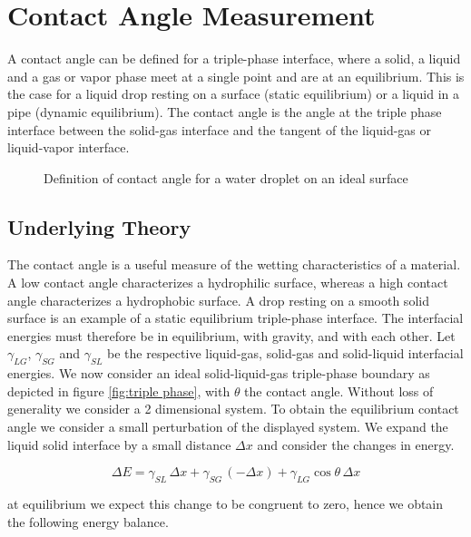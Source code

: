 \section{Contact Angle Measurement}

A contact angle can be defined for a triple-phase interface, where a solid, a liquid and a gas or vapor phase meet at a single point and are at an equilibrium. This is the case for a liquid drop resting on a surface (static equilibrium) or a liquid in a pipe (dynamic equilibrium). The contact angle is the angle at the triple phase interface between the solid-gas interface and the tangent of the liquid-gas or liquid-vapor interface.

\begin{figure}
\centering

\caption{Definition of contact angle for a water droplet on an ideal surface}
\label{fig:contact_angle}
\end{figure}


\subsection{Underlying Theory}

The contact angle is a useful measure of the wetting characteristics of a material. A low contact angle characterizes a hydrophilic surface, whereas a high contact angle characterizes a hydrophobic surface. 
A drop resting on a smooth solid surface is an example of a static equilibrium triple-phase interface. The interfacial energies must therefore be in equilibrium, with gravity, and with each other. Let $\gamma_{LG}$, $\gamma_{SG}$ and $\gamma_{SL}$ be the respective liquid-gas, solid-gas and solid-liquid interfacial energies. We now consider an ideal solid-liquid-gas triple-phase boundary as depicted in figure \ref{fig:triple phase}, with $\theta$ the contact angle. Without loss of generality we consider a 2 dimensional system. To obtain the equilibrium contact angle we consider a small perturbation of the displayed system. We expand the liquid solid interface by a small distance $\Delta x$ and consider the changes in energy.

\begin{equation}
\Delta E = \gamma_{SL}\, \Delta x + \gamma_{SG} \, ( - \Delta x) + \gamma_{LG} \cos{\theta} \, \Delta x
\end{equation}

at equilibrium we expect this change to be congruent to zero, hence we obtain the following energy balance.

